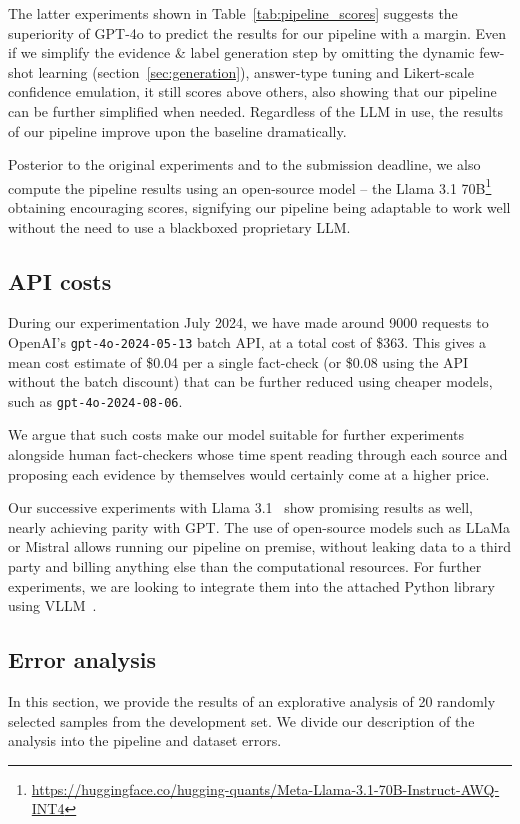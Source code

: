 The latter experiments shown in Table~\ref{tab:pipeline_scores} suggests the superiority of GPT-4o to predict the results for our pipeline with a margin.
Even if we simplify the evidence \& label generation step by omitting the dynamic few-shot learning (section~\ref{sec:generation}), answer-type tuning and Likert-scale confidence emulation, it still scores above others, also showing that our pipeline can be further simplified when needed.
Regardless of the LLM in use, the results of our pipeline improve upon the \averitec{} baseline dramatically.

Posterior to the original experiments and to the \averitec{} submission deadline, we also compute the pipeline results using an open-source model -- the Llama 3.1 70B\footnote{\url{https://huggingface.co/hugging-quants/Meta-Llama-3.1-70B-Instruct-AWQ-INT4}}~\cite{dubey2024llama3herdmodels} obtaining encouraging scores, signifying our pipeline being adaptable to work well without the need to use a blackboxed proprietary LLM.

\subsection{API costs}
During our experimentation July 2024, we have made around 9000 requests to OpenAI's \texttt{gpt-4o-2024-05-13} batch API, at a total cost of \$363.
This gives a mean cost estimate of \$0.04 per a single fact-check (or \$0.08 using the API without the batch discount) that can be further reduced using cheaper models, such as \texttt{gpt-4o-2024-08-06}.

We argue that such costs make our model suitable for further experiments alongside human fact-checkers\review{,} whose time spent reading through each source and proposing each evidence by themselves would certainly come at a higher price.

Our successive experiments with Llama 3.1~\cite{dubey2024llama3herdmodels} show promising results as well, nearly achieving parity with GPT.
The use of open-source models such as LLaMa or Mistral allows running our pipeline on premise, without leaking data to a third party and billing anything else than the computational resources.
For further experiments, we are looking to integrate them into the attached Python library using VLLM~\cite{vllm}.

\subsection{Error analysis}
In this section, we provide the results of an explorative analysis of 20 randomly selected samples from the development set. We divide our description of the analysis into the pipeline and dataset errors.



